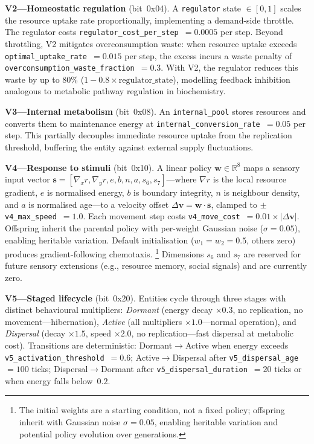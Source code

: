 \documentclass[letterpaper]{article}
\begin{document}
\textbf{V2---Homeostatic regulation} (bit~0x04).
A \texttt{regulator} state $\in [0,1]$ scales the resource uptake rate
proportionally, implementing a demand-side throttle.
The regulator costs \texttt{regulator\_cost\_per\_step}~$=0.0005$ per step.
Beyond throttling, V2 mitigates overconsumption waste: when resource uptake
exceeds \texttt{optimal\_uptake\_rate}~$=0.015$ per step, the excess incurs a
waste penalty of \texttt{overconsumption\_waste\_fraction}~$=0.3$.
With V2, the regulator reduces this waste by up to 80\%
($1 - 0.8 \times \text{regulator\_state}$), modelling feedback inhibition
analogous to metabolic pathway regulation in biochemistry.

\textbf{V3---Internal metabolism} (bit~0x08).
An \texttt{internal\_pool} stores resources and converts them to maintenance
energy at \texttt{internal\_conversion\_rate}~$=0.05$ per step.
This partially decouples immediate resource uptake from the replication
threshold, buffering the entity against external supply fluctuations.

\textbf{V4---Response to stimuli} (bit~0x10).
A linear policy $\mathbf{w} \in \mathbb{R}^8$ maps a sensory input vector
$\mathbf{s} = [\nabla_x r, \nabla_y r, e, b, n, a, s_6, s_7]$---where
$\nabla r$ is the local resource gradient, $e$ is normalised energy,
$b$ is boundary integrity, $n$ is neighbour density, and $a$ is normalised
age---to a velocity offset $\Delta\mathbf{v} = \mathbf{w} \cdot \mathbf{s}$,
clamped to $\pm$\texttt{v4\_max\_speed}~$=1.0$.
Each movement step costs \texttt{v4\_move\_cost}~$=0.01 \times |\Delta\mathbf{v}|$.
Offspring inherit the parental policy with per-weight Gaussian noise
($\sigma\!=\!0.05$), enabling heritable variation.
Default initialisation ($w_1\!=\!w_2\!=\!0.5$, others zero) produces
gradient-following chemotaxis.%
\footnote{The initial weights are a starting condition, not a fixed policy;
offspring inherit with Gaussian noise $\sigma\!=\!0.05$, enabling
heritable variation and potential policy evolution over generations.}
Dimensions $s_6$ and $s_7$ are reserved for future sensory extensions
(e.g., resource memory, social signals) and are currently zero.

\textbf{V5---Staged lifecycle} (bit~0x20).
Entities cycle through three stages with distinct behavioural multipliers:
\emph{Dormant} (energy decay $\times 0.3$, no replication, no movement---hibernation),
\emph{Active} (all multipliers $\times 1.0$---normal operation), and
\emph{Dispersal} (decay $\times 1.5$, speed $\times 2.0$, no replication---fast
dispersal at metabolic cost).
Transitions are deterministic: Dormant$\to$Active when energy exceeds
\texttt{v5\_activation\_threshold}~$=0.6$; Active$\to$Dispersal after
\texttt{v5\_dispersal\_age}~$=100$ ticks; Dispersal$\to$Dormant after
\texttt{v5\_dispersal\_duration}~$=20$ ticks or when energy falls below~$0.2$.
\end{document}
